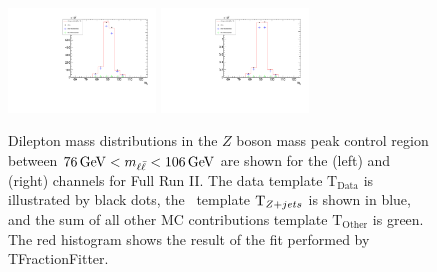 \begin{figure}[htb]
  \begin{center}
        \includegraphics[width=0.35\textwidth]{fig_fullRun2UL/fit_status_ee.pdf}
        \includegraphics[width=0.35\textwidth]{fig_fullRun2UL/fit_status_mumu.pdf}
        \caption{
            \small Dilepton mass distributions in the $Z$ boson mass peak control region between $\SI{76}{\GeV} < \mll < \SI{106}{\GeV}$ are shown for the \ee (left) and \mumu (right) channels for Full Run II. 
            The data template $\text{T}_\text{Data}$ is illustrated by black dots, the \zjets\ template $\text{T}_{Z+jets}$ is shown in blue, and the sum of all other MC contributions template $\text{T}_\text{Other}$ is green. 
            The red histogram shows the result of the fit performed by TFractionFitter.
            \label{fig:fitstatusfullRun2UL}
    }
  \end{center}
\end{figure}

